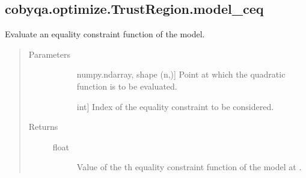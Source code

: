 \documentclass[letterpaper,10pt,english]{sphinxmanual}
\begin{document}
\begin{fulllineitems}
\begin{fulllineitems}
\begin{quote}
\begin{description}
\begin{description}
\end{description}

\end{description}\end{quote}

\end{fulllineitems}



\subsection{cobyqa.optimize.TrustRegion.model\_ceq}
\label{\detokenize{refs/generated/cobyqa.optimize.TrustRegion.model_ceq:cobyqa-optimize-trustregion-model-ceq}}\label{\detokenize{refs/generated/cobyqa.optimize.TrustRegion.model_ceq::doc}}

\begin{fulllineitems}
\label{\detokenize{refs/generated/cobyqa.optimize.TrustRegion.model_ceq:cobyqa.optimize.TrustRegion.model_ceq}}
\sphinxAtStartPar
Evaluate an equality constraint function of the model.
\begin{quote}\begin{description}
\item[{Parameters}] \leavevmode\begin{description}
\item[{}] \leavevmode{[}numpy.ndarray, shape (n,){]}
\sphinxAtStartPar
Point at which the quadratic function is to be evaluated.

\item[{}] \leavevmode{[}int{]}
\sphinxAtStartPar
Index of the equality constraint to be considered.

\end{description}

\item[{Returns}] \leavevmode\begin{description}
\item[{float}] \leavevmode
\sphinxAtStartPar
Value of the \sphinxhyphen{}th equality constraint function of the model at
.

\end{description}


\end{description}
\end{quote}
\end{fulllineitems}
\end{fulllineitems}
\end{document}
